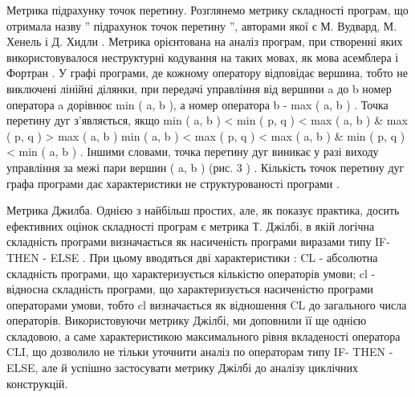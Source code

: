 Метрика підрахунку точок перетину.
Розглянемо метрику складності програм, що отримала назву '' підрахунок точок перетину '', авторами якої є М. Вудвард, М. Хенель і Д. Хидли . Метрика орієнтована на аналіз програм, при створенні яких використовувалося неструктурні кодування на таких мовах, як мова асемблера і Фортран .
У графі програми, де кожному оператору відповідає вершина, тобто не виключені лінійні ділянки, при передачі управління від вершини a до b номер оператора a дорівнює min ( a, b ), а номер оператора b - max ( a, b ) . Точка перетину дуг з'являється, якщо
min ( a, b ) \textless{} min ( p, q ) \textless{} max ( a, b ) \& max ( p, q ) \textgreater{} max ( a, b ) \textbar{}
min ( a, b ) \textless{} max ( p, q ) \textless{} max ( a, b ) \& min ( p, q ) \textless{} min ( a, b ) .
Іншими словами, точка перетину дуг виникає у разі виходу управління за межі пари вершин ( a, b ) (рис. 3 ) .
Кількість точок перетину дуг графа програми дає характеристики не структурованості програми .

Метрика Джилба.
Однією з найбільш простих, але, як показує практика, досить ефективних оцінок складності програм є метрика Т. Джілбі, в якій логічна складність програми визначається як насиченість програми виразами типу IF- THEN - ELSE . При цьому вводяться дві характеристики : CL - абсолютна складність програми, що характеризується кількістю операторів умови; cl - відносна складність програми, що характеризується насиченістю програми операторами умови, тобто cl визначається як відношення CL до загального числа операторів.
Використовуючи метрику Джілбі, ми доповнили її ще однією складовою, а саме характеристикою максимального рівня вкладеності оператора CLI, що дозволило не тільки уточнити аналіз по операторам типу IF- THEN - ELSE, але й успішно застосувати метрику Джілбі до аналізу циклічних конструкцій.

